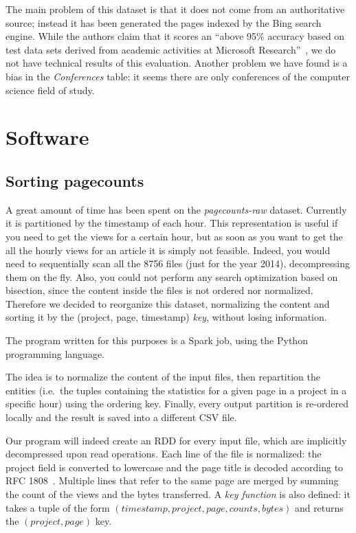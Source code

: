 The main problem of this dataset is that it does not come from an authoritative source; instead it has been generated the pages indexed by the Bing search engine.
While the authors claim that it scores an ``above 95\% accuracy based on test data sets derived from academic activities at Microsoft Research''~\cite{Sinha2015}, we do not have technical results of this evaluation.
Another problem we have found is a bias in the \emph{Conferences} table: it seems there are only conferences of the computer science field of study.


\section{Software}
\label{sec:software}
\subsection{Sorting pagecounts}
\label{sub:Sorting pagecounts}
A great amount of time has been spent on the \emph{pagecounts-raw} dataset.
Currently it is partitioned by the timestamp of each hour.
This representation is useful if you need to get the views for a certain hour, but as soon as you want to get the all the hourly views for an article it is simply not feasible.
Indeed, you would need to sequentially scan all the 8756 files (just for the year 2014), decompressing them on the fly.
Also, you could not perform any search optimization based on bisection, since the content inside the files is not ordered nor normalized.
Therefore we decided to reorganize this dataset, normalizing the content and sorting it by the (project, page, timestamp) \emph{key}, without losing information.

The program written for this purposes is a Spark job, using the Python programming language.

The idea is to normalize the content of the input files, then repartition the entities (i.e.\ the tuples containing the statistics for a given page in a project in a specific hour) using the ordering key.
Finally, every output partition is re-ordered locally and the result is saved into a different CSV file.

Our program will indeed create an \ac{RDD} for every input file, which are implicitly decompressed upon read operations.
Each line of the file is normalized: the project field is converted to lowercase and the page title is decoded according to RFC 1808~\cite{rfc1808}.
Multiple lines that refer to the same page are merged by summing the count of the views and the bytes transferred.
A \emph{key function} is also defined: it takes a tuple of the form $(timestamp, project, page, counts, bytes)$ and returns the $(project, page)$ key.

